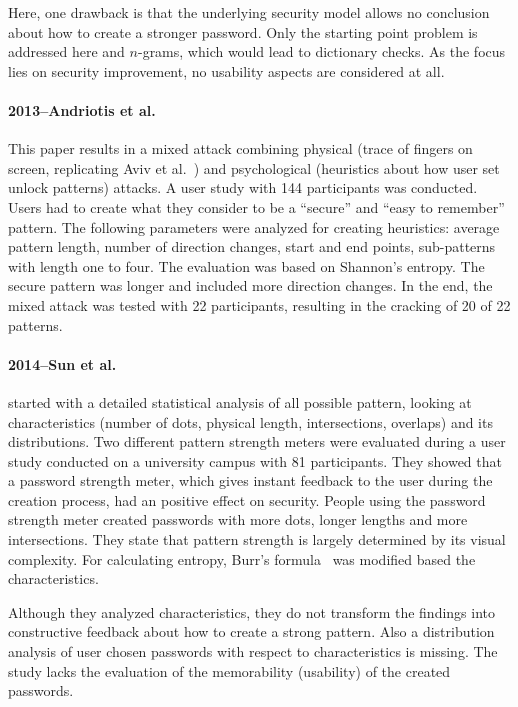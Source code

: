 \documentclass[twocolumn, a4paper, 10pt]{article}
\begin{document}
Here, one drawback is that the underlying security model allows no conclusion about how to create a stronger password. Only the starting point problem is addressed here and $n$-grams, which would lead to dictionary checks. As the focus lies on security improvement, no usability aspects are considered at all.


\paragraph{2013--Andriotis et al.~\cite{Andriotis:2013:PSS:2462096.2462098}} 
This paper results in a mixed attack combining physical (trace of fingers on screen, replicating Aviv et al.~\cite{Aviv:2010:SAS:1925004.1925009}) and psychological (heuristics about how user set unlock patterns) attacks. A user study with 144 participants was conducted. Users had to create what they consider to be a ``secure'' and ``easy to remember'' pattern. The following parameters were analyzed for creating heuristics: average pattern length, number of direction changes, start and end points, sub-patterns with length one to four. The evaluation was based on Shannon's entropy. The secure pattern was longer and included more direction changes. In the end, the mixed attack was tested with 22 participants, resulting in the cracking of 20 of 22 patterns.


\paragraph{2014--Sun et al.~\cite{Sun2014308}}
started with a detailed statistical analysis of all possible pattern, looking at characteristics (number of dots, physical length, intersections, overlaps) and its distributions. Two different pattern strength meters were evaluated during a user study conducted on a university campus with 81 participants. They showed that a password strength meter, which gives instant feedback to the user during the creation process, had an positive effect on security. People using the password strength meter created passwords with more dots, longer lengths and more intersections. They state that pattern strength is largely determined by its visual complexity. For calculating entropy, Burr's formula~\cite{burr2004electronic} was modified based the  characteristics.

Although they analyzed characteristics, they do not transform the findings into constructive feedback about how to create a strong pattern. Also a distribution analysis of user chosen passwords with respect to characteristics is missing. The study lacks the evaluation of the memorability (usability) of the created passwords.
\end{document}

